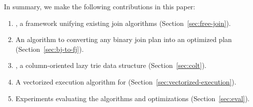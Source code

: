  
In summary, we make the following contributions in this paper:
\begin{enumerate}
  \item \FJ, a framework unifying existing join algorithms (Section~\ref{sec:free-join}).
  \item An algorithm to converting any binary join plan into an
    optimized \FJ plan (Section~\ref{sec:bj-to-fj}).
  \item \COLT, a column-oriented lazy trie data structure (Section~\ref{sec:colt}).
  \item A vectorized execution algorithm for \FJ (Section~\ref{sec:vectorized-execution}).
  \item Experiments evaluating the algorithms and optimizations (Section~\ref{sec:eval}).
\end{enumerate}